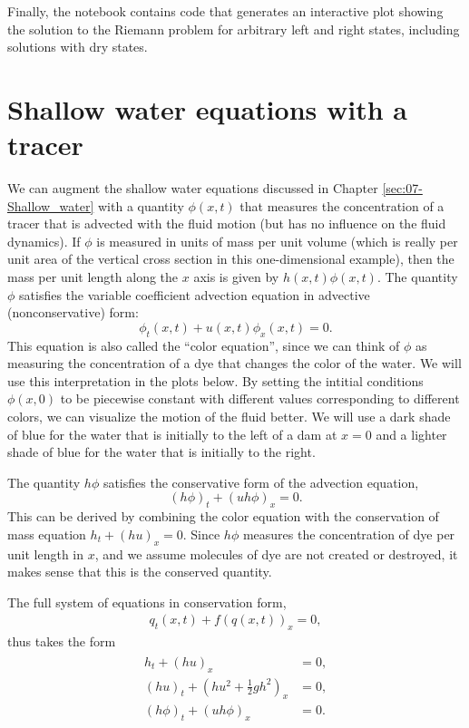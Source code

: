 \documentclass{SIAMbook2016}
\begin{document}
Finally, the notebook contains code that generates an interactive plot
showing the solution to the Riemann problem for arbitrary left and right
states, including solutions with dry states.

\hypertarget{shallow-water-equations-with-a-tracer}{%
\chapter{Shallow water equations with a
tracer}\label{shallow-water-equations-with-a-tracer}}
\label{sec:08-Shallow_tracer}

We can augment the shallow water equations discussed in
Chapter \ref{sec:07-Shallow_water} with a quantity \(\phi(x,t)\) that
measures the concentration of a tracer that is advected with the fluid
motion (but has no influence on the fluid dynamics). If \(\phi\) is
measured in units of mass per unit volume (which is really per unit area
of the vertical cross section in this one-dimensional example), then the
mass per unit length along the \(x\) axis is given by
\(h(x,t)\phi(x,t)\). The quantity \(\phi\) satisfies the variable
coefficient advection equation in advective (nonconservative) form: \[
\phi_t(x,t) + u(x,t)\phi_x(x,t) = 0.
\] This equation is also called the ``color equation'', since we can
think of \(\phi\) as measuring the concentration of a dye that changes
the color of the water. We will use this interpretation in the plots
below. By setting the intitial conditions \(\phi(x,0)\) to be piecewise
constant with different values corresponding to different colors, we can
visualize the motion of the fluid better. We will use a dark shade of
blue for the water that is initially to the left of a dam at \(x=0\) and
a lighter shade of blue for the water that is initially to the right.

The quantity \(h\phi\) satisfies the conservative form of the advection
equation, \[
(h\phi)_t + (uh\phi)_x = 0.
\] This can be derived by combining the color equation with the
conservation of mass equation \(h_t +(hu)_x = 0\). Since \(h\phi\)
measures the concentration of dye per unit length in \(x\), and we
assume molecules of dye are not created or destroyed, it makes sense
that this is the conserved quantity.

The full system of equations in conservation form,
\begin{align} \label{SW-tracer}
q_t(x,t) + f(q(x,t))_x = 0,
\end{align} thus takes the form \begin{align*}
\begin{split}
h_t + (hu)_x &=0,\\
(hu)_t + \left(hu^2 + \frac 1 2 gh^2\right)_x &=0,\\
(h\phi)_t + (uh\phi)_x &= 0.
\end{split}
\end{align*}
\end{document}
